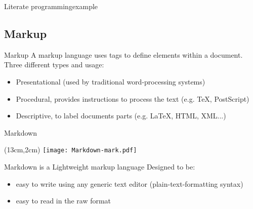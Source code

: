 \begin{frame}{Literate programming}{example}
\end{frame}

\subsection*{Markup}
\begin{frame}[<+->]{Markup}
A markup language uses tags to deﬁne elements within a document. \newline
Three different types and usage:
\pause
\begin{itemize}
	\item Presentational (used by traditional word-processing systems)
	\item Procedural, provides instructions to process the text (e.g. TeX, PostScript)
	\item Descriptive, to label documents parts (e.g. LaTeX, HTML, XML...)
\end{itemize}
\end{frame}

\begin{frame}{Markdown}
\begin{textblock*}{5cm}(13cm,2cm) %
\texttt{[image: Markdown-mark.pdf]}
\end{textblock*}
Markdown is a Lightweight markup language
\newline
Designed to be:
\pause
\begin{itemize}[<+->]
	\item easy to write using any generic text editor (plain-text-formatting syntax)
	\item easy to read in the raw format
\end{itemize}
\end{frame}

